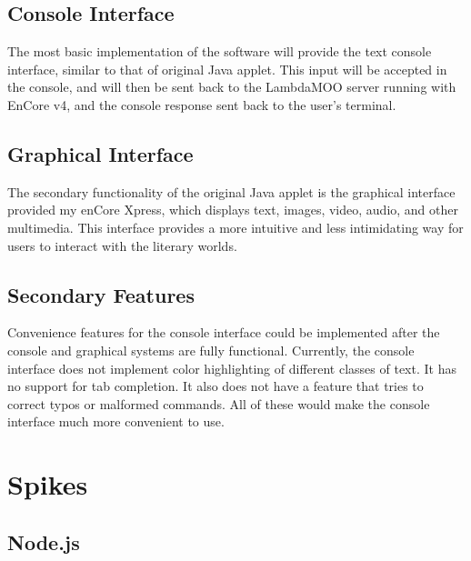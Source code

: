 \documentclass[12pt, letterpaper]{report}
\begin{document}
\section{Console Interface}
The most basic implementation of the software will provide the text console interface, similar to that of original Java applet. This input will be accepted in the console, and will then be sent back to the LambdaMOO server running with EnCore v4, and the console response sent back to the user's terminal.

\section{Graphical Interface}
The secondary functionality of the original Java applet is the graphical interface provided my enCore Xpress, which displays text, images, video, audio, and other multimedia. This interface provides a more intuitive and less intimidating way for users to interact with the literary worlds. 

\section{Secondary Features}
Convenience features for the console interface could be implemented after the console and graphical systems are fully functional. Currently, the console interface does not implement color highlighting of different classes of text. It has no support for tab completion. It also does not have a feature that tries to correct typos or malformed commands. All of these would make the console interface much more convenient to use.

\par



\chapter{Spikes}
\section{Node.js}


\end{document}
